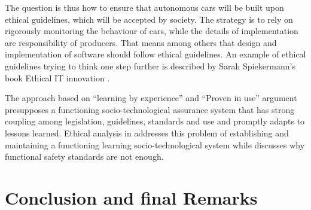 The question is thus how to ensure that autonomous cars will be built upon ethical guidelines, which will be accepted by society. The strategy is to rely on rigorously monitoring the behaviour of cars, while the details of implementation are responsibility of producers. That means among others that design and implementation of software should follow ethical guidelines. An example of ethical guidelines trying to think one step further is described by Sarah Spiekermann's book Ethical IT innovation \cite{spiekermann2015ethical}. 

The approach based on \enquote{learning by experience} and \enquote{Proven in use} argument \cite{GovernmentNL2017,NationalInstruments2014a,DBLP:journals/corr/SchabeB15} presupposes a functioning socio-technological assurance system that has strong coupling among legislation, guidelines, standards and use and promptly adapts to lessons learned. Ethical analysis in \cite{DodigCrnkovic2012, Thekkilakattil_7273594,Johnsen2017_7958474} addresses this problem of establishing and maintaining a functioning learning socio-technological system while \cite{Johnsen2017_7958474} discusses why functional safety standards are not enough.


\section{Conclusion and final Remarks}
\label{sec:Conclusion}




